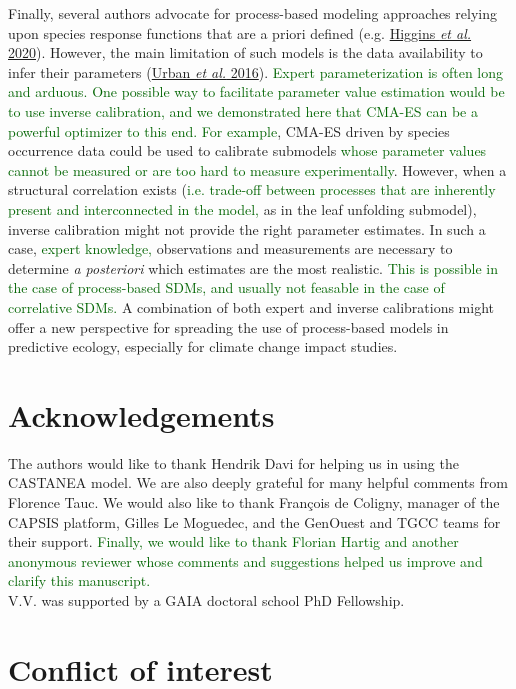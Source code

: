 \documentclass[11pt,]{article}
\begin{document}
Finally, several authors advocate for process-based modeling approaches
relying upon species response functions that are a priori defined (e.g.
\protect\hyperlink{ref-Higgins2020}{Higgins \emph{et al.} 2020}).
However, the main limitation of such models is the data availability to
infer their parameters (\protect\hyperlink{ref-Urban2016}{Urban \emph{et
al.} 2016}).
\textcolor{darkgreen}{Expert parameterization is often long and arduous. One possible way to facilitate parameter value estimation would be to use inverse calibration, and we demonstrated here that CMA-ES can be a powerful optimizer to this end. For example},
CMA-ES driven by species occurrence data could be used to calibrate
submodels
\textcolor{darkgreen}{whose parameter values cannot be measured or are too hard to measure experimentally}.
However, when a structural correlation exists
(\textcolor{darkgreen}{i.e. trade-off between processes that are inherently present and interconnected in the model,}
as in the leaf unfolding submodel), inverse calibration might not
provide the right parameter estimates. In such a case,
\textcolor{darkgreen}{expert knowledge,} observations and measurements
are necessary to determine \emph{a posteriori} which estimates are the
most realistic.
\textcolor{darkgreen}{This is possible in the case of process-based SDMs, and usually not feasable in the case of correlative SDMs.}
A combination of both expert and inverse calibrations might offer a new
perspective for spreading the use of process-based models in predictive
ecology, especially for climate change impact studies.

\hypertarget{acknowledgements}{%
\section{Acknowledgements}\label{acknowledgements}}

The authors would like to thank Hendrik Davi for helping us in using the
CASTANEA model. We are also deeply grateful for many helpful comments
from Florence Tauc. We would also like to thank François de Coligny,
manager of the CAPSIS platform, Gilles Le Moguedec, and the GenOuest and
TGCC teams for their support.
\textcolor{darkgreen}{Finally, we would like to thank Florian Hartig and another anonymous reviewer whose comments and suggestions helped us improve and clarify this manuscript.}\\
V.V. was supported by a GAIA doctoral school PhD Fellowship.

\hypertarget{conflict-of-interest}{%
\section{Conflict of interest}\label{conflict-of-interest}}
\end{document}
